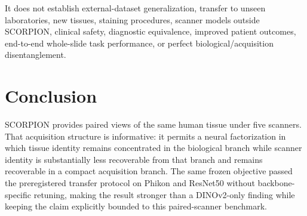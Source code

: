 \documentclass[10pt]{article}
\begin{document}
It does not establish external-dataset generalization, transfer to unseen laboratories, new tissues, staining procedures, scanner models outside SCORPION, clinical safety, diagnostic equivalence, improved patient outcomes, end-to-end whole-slide task performance, or perfect biological/acquisition disentanglement.

\section{Conclusion}
SCORPION provides paired views of the same human tissue under five scanners. That acquisition structure is informative: it permits a neural factorization in which tissue identity remains concentrated in the biological branch while scanner identity is substantially less recoverable from that branch and remains recoverable in a compact acquisition branch. The same frozen objective passed the preregistered transfer protocol on Phikon and ResNet50 without backbone-specific retuning, making the result stronger than a DINOv2-only finding while keeping the claim explicitly bounded to this paired-scanner benchmark.



\end{document}
